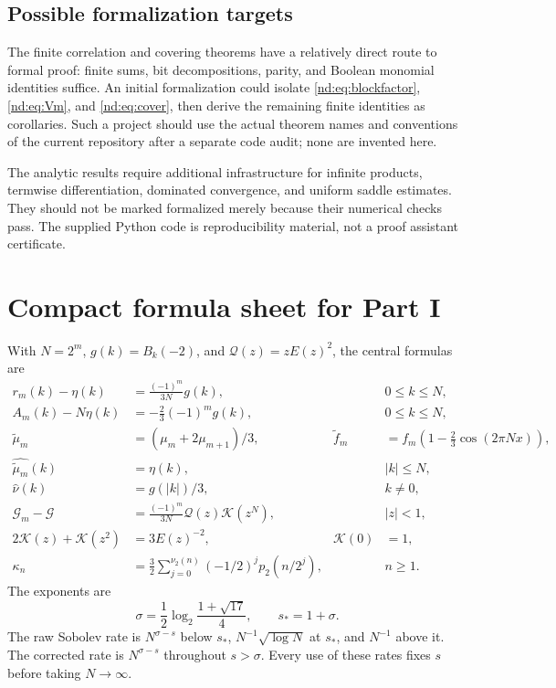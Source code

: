 \documentclass[11pt,a4paper,oneside,openany]{book}
\numberwithin{equation}{chapter}
\theoremstyle{definition}
\theoremstyle{remark}
\newcommand{\mt}{\widetilde\mu}
\newcommand{\ft}{\widetilde f}
\newcommand{\vnu}{\nu_2}
\begin{document}
\section{Possible formalization targets}
The finite correlation and covering theorems have a relatively direct route
to formal proof: finite sums, bit decompositions, parity, and Boolean monomial
identities suffice. An initial formalization could isolate
\eqref{nd:eq:blockfactor}, \eqref{nd:eq:Vm}, and \eqref{nd:eq:cover}, then derive the
remaining finite identities as corollaries. Such a project should use the
actual theorem names and conventions of the current repository after a
separate code audit; none are invented here.

The analytic results require additional infrastructure for infinite products,
termwise differentiation, dominated convergence, and uniform saddle estimates.
They should not be marked formalized merely because their numerical checks
pass. The supplied Python code is reproducibility material, not a proof
assistant certificate.

\appendix

\chapter{Compact formula sheet for Part I}
\label{bc:app:formula}
With $N=2^m$, $g(k)=B_k(-2)$, and $\mathcal Q(z)=zE(z)^2$, the central formulas are
\begin{align*}
 r_m(k)-\eta(k)&=\frac{(-1)^m}{3N}g(k),&&0\le k\le N,\\
 A_m(k)-N\eta(k)&=-\frac23(-1)^mg(k),&&0\le k\le N,\\
 \mt_m&=(\mu_m+2\mu_{m+1})/3,&
 \ft_m&=f_m(1-\tfrac23\cos(2\pi Nx)),\\
 \widehat{\mt_m}(k)&=\eta(k),&&|k|\le N,\\
 \widehat\nu(k)&=g(|k|)/3,&&k\ne0,\\
 \mathcal G_m-\mathcal G&=\frac{(-1)^m}{3N}\mathcal Q(z)\mathcal K(z^N),&&|z|<1,\\
 2\mathcal K(z)+\mathcal K(z^2)&=3E(z)^{-2},&\mathcal K(0)&=1,\\
 \kappa_n&=\frac32\sum_{j=0}^{\vnu(n)}(-1/2)^jp_2(n/2^j),&&n\ge1.
\end{align*}
The exponents are
\[
 \sigma=\frac12\log_2\frac{1+\sqrt{17}}4,\qquad s_*=1+\sigma.
\]
The raw Sobolev rate is $N^{\sigma-s}$ below $s_*$, $N^{-1}\sqrt{\log N}$ at
$s_*$, and $N^{-1}$ above it. The corrected rate is $N^{\sigma-s}$ throughout
$s>\sigma$. Every use of these rates fixes $s$ before taking $N\to\infty$.
\end{document}
